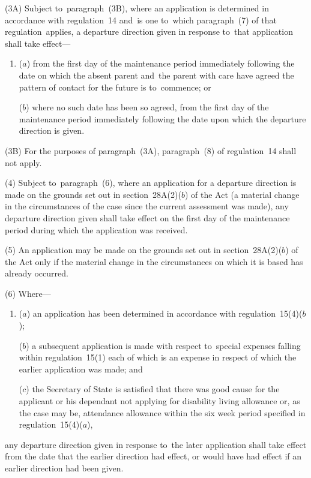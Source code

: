 \documentclass[12pt,a4paper]{article}
\begin{document}
(3A) 
Subject to~paragraph~(3B), where  %
an application is determined in accordance with regulation~14 and~is one to~which paragraph~(7) of that regulation~applies, a departure direction given in response to~that application shall take effect—
\begin{enumerate}\item[]
($a$) from the first day of the maintenance period immediately following the date on which the absent parent and~the parent with care have agreed the pattern of contact for the future is to~commence; or

($b$) where no such date has been so agreed, from the first day of the maintenance period immediately following the date upon which the departure direction is given.
\end{enumerate}

(3B) For the purposes of paragraph~(3A), paragraph~(8) of regulation~14 shall not apply.

(4) Subject to~paragraph~(6), where an application for a departure direction is
made on the grounds set out in section~28A(2)($b$) of the Act (a material change
in the circumstances of the case since the current assessment was made), any
departure direction given shall take effect on the first day of the maintenance
period during which the application was received.

\begin{sloppypar}
(5) An application may be made on the grounds set out in section~28A(2)($b$) of
the Act only if the material change in the circumstances on which it is based
has already occurred.
\end{sloppypar}

(6) Where—
\begin{enumerate}\item[]
($a$) an application has been determined in accordance with regulation~15(4)($b$);

($b$) a subsequent application is made with respect to~special expenses falling
within regulation~15(1) each of which is an expense in respect of which the
earlier application was made; and

($c$) the Secretary of State is satisfied that there was good cause for the
applicant or his dependant not applying for disability living allowance or, as
the case may be, attendance allowance within the six week period specified in
regulation~15(4)($a$),
\end{enumerate}
any departure direction given in response to~the later application shall take
effect from the date that the earlier direction had effect, or would have had
effect if an earlier direction had been given.
\end{document}
